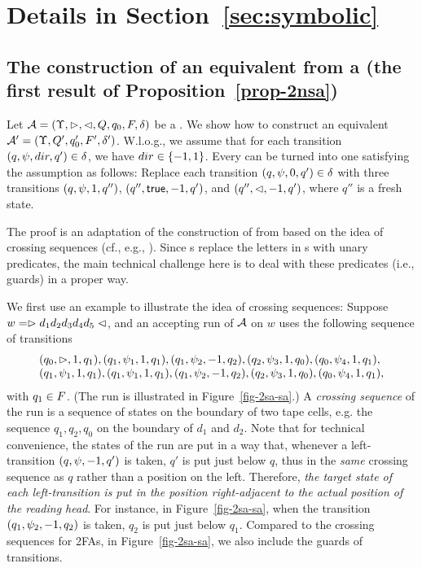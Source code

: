 \section{Details in Section~\ref{sec:symbolic}}\label{app-sym}

\subsection{The construction of an equivalent \SA{} from a \SSA{}(the first result of Proposition~\ref{prop-2nsa})}

Let $\mathcal{A} = (\Upsilon, \vartriangleright, \vartriangleleft, Q, q_0, F, \delta)$ be a \SSA. We show how to construct an equivalent \SA{} $\mathcal{A}' =  (\Upsilon, Q', q'_0, F', \delta')$.
W.l.o.g., we assume that for each transition $(q, \psi, dir, q') \in \delta$, we have $dir \in \{-1,1\}$. Every \SSA{} can be turned into one \SSA{} satisfying the assumption as follows: Replace each transition $(q, \psi, 0, q') \in \delta$ with three transitions $(q, \psi, 1, q'')$, $(q'', \mathsf{true}, -1, q')$, and $(q'', \vartriangleleft, -1, q')$, where $q''$ is a fresh state.

The proof is an adaptation of the construction of \FA{} from \FFA{} based on the idea of crossing sequences (cf., e.g., \cite{HU79}). Since \SSA{}s replace the letters in \FFA{}s with unary predicates, the main technical challenge here is to deal with these predicates (i.e., guards) in a proper way.

We first use an example to illustrate the idea of crossing sequences: Suppose $w = \vartriangleright d_1 d_2 d_3 d_4 d_5\vartriangleleft$, and an accepting run of $\mathcal{A}$ on $w$ uses the following sequence of transitions 
\[
\begin{array}{l}
(q_0, \vartriangleright, 1, q_1), (q_1, \psi_1, 1, q_1), (q_1, \psi_2, -1, q_2), (q_2, \psi_3, 1, q_0), (q_0, \psi_4, 1, q_1), \\
(q_1, \psi_1, 1, q_1), (q_1, \psi_1, 1, q_1), (q_1, \psi_2, -1, q_2), (q_2, \psi_3, 1, q_0), (q_0, \psi_4, 1, q_1),
\end{array}
\] 
with $q_1 \in F$.
(The run is illustrated in Figure~\ref{fig-2sa-sa}.) A \emph{crossing sequence} of the run is a sequence of states on the boundary of two tape cells, e.g. the sequence $q_1, q_2, q_0$ on the boundary of $d_1$ and $d_2$. Note that for technical convenience, the states of the run are put in a way that, whenever a left-transition $(q, \psi, -1, q')$ is taken, $q'$ is put just below $q$, thus in the \emph{same} crossing sequence as $q$ rather than a position on the left. Therefore, 
\emph{the target state of each left-transition is put in the position right-adjacent to the actual position of the reading head}.
For instance, in Figure~\ref{fig-2sa-sa}, when the transition $(q_1, \psi_2, -1, q_2)$ is taken, $q_2$ is put just below $q_1$. Compared to the crossing sequences for 2FAs, in Figure~\ref{fig-2sa-sa}, we also include the guards of transitions. 

